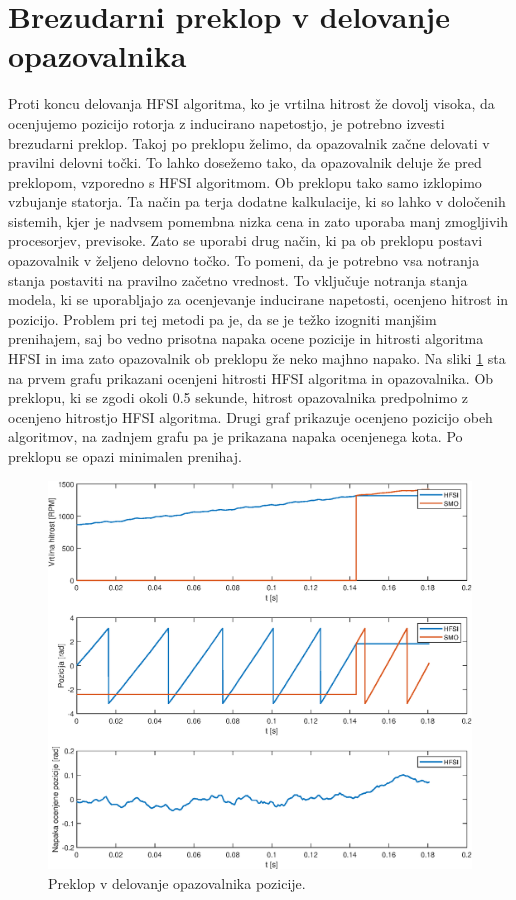 \documentclass[a4paper,twoside,openright,12pt,slovene]{book}
\begin{document}
\section{Brezudarni preklop v delovanje opazovalnika}

Proti koncu delovanja HFSI algoritma, ko je vrtilna hitrost že dovolj visoka, da ocenjujemo pozicijo rotorja z inducirano napetostjo, je potrebno izvesti brezudarni preklop. Takoj po preklopu želimo,
da opazovalnik začne delovati v pravilni delovni točki. To lahko dosežemo tako, da opazovalnik deluje že pred preklopom, vzporedno s HFSI algoritmom. Ob preklopu tako samo izklopimo vzbujanje
statorja. Ta način pa terja dodatne kalkulacije, ki so lahko v določenih sistemih, kjer je nadvsem pomembna nizka cena in zato uporaba manj zmogljivih procesorjev, previsoke. Zato se uporabi drug
način, ki pa ob preklopu postavi opazovalnik v željeno delovno točko. To pomeni, da je potrebno vsa notranja stanja postaviti na pravilno začetno vrednost. To vključuje notranja stanja modela, ki se
uporabljajo za ocenjevanje inducirane napetosti, ocenjeno hitrost in pozicijo. Problem pri tej metodi pa je, da se je težko izogniti manjšim prenihajem, saj bo vedno prisotna napaka ocene
pozicije in hitrosti algoritma HFSI in ima zato opazovalnik ob preklopu že neko majhno napako. Na sliki \ref{brezudarniPreklop} sta na prvem grafu prikazani ocenjeni hitrosti HFSI algoritma in
opazovalnika. Ob preklopu, ki se zgodi okoli 0.5 sekunde, hitrost opazovalnika predpolnimo z ocenjeno hitrostjo HFSI algoritma. Drugi graf prikazuje ocenjeno pozicijo obeh algoritmov, na zadnjem grafu
pa je prikazana napaka ocenjenega kota. Po preklopu se opazi minimalen prenihaj.

\begin{figure}[!htbp]
    \centering
    \includegraphics[width=1\columnwidth]{Slike/brezudarniPreklop.eps}
    \caption{\label{brezudarniPreklop} Preklop v delovanje opazovalnika pozicije. }
\end{figure}
\end{document}

